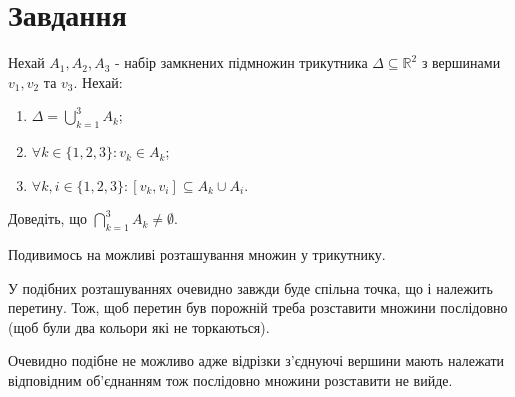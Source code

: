
\chapter{Завдання \theHchapter}

\begin{tcolorbox}[title=Завдання]
    Нехай $A_{1}, A_{2}, A_{3}$ - набір замкнених підмножин трикутника 
    $\Delta \subseteq \mathbb{R}^{2}$ з вершинами 
    $v_{1}, v_{2}$ та $v_{3}$. 
    Нехай:
    \begin{enumerate}
    \item $\Delta=\bigcup_{k=1}^{3} A_{k}$;

    \item $\forall k \in\{1,2,3\}: v_{k} \in A_{k}$;

    \item $\forall k, i \in\{1,2,3\}:\left[v_{k}, v_{i}\right] \subseteq A_{k} \cup A_{i}$.

    \end{enumerate}

    Доведіть, що $\bigcap_{k=1}^{3} A_{k} \neq \emptyset$.


\end{tcolorbox}



Подивимось на можливі розташування множин у трикутнику.

\vspace{3 em}


У подібних розташуваннях очевидно завжди буде спільна точка, 
що і належить перетину. Тож, щоб перетин був порожній треба розставити 
множини послідовно (щоб були два кольори які не торкаються).


Очевидно подібне не можливо адже відрізки з'єднуючі вершини мають належати 
відповідним об'єднанням тож послідовно множини розставити не вийде.

